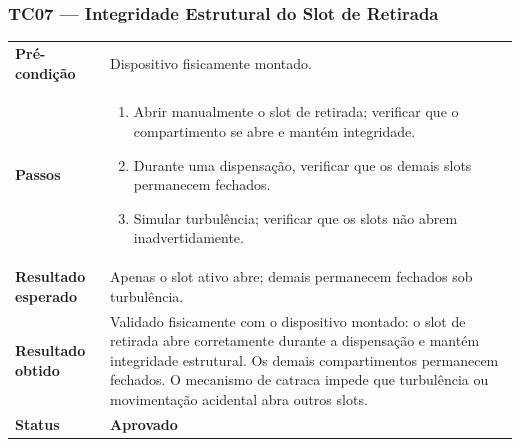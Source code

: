 \documentclass[12pt,a4paper]{article}
\newcommand{\lightrule}{\arrayrulecolor{gray!35}\midrule\arrayrulecolor{black}}
\newcommand{\aprovado}{\textcolor{green!60!black}{\textbf{Aprovado}}}
\begin{document}
\subsubsection{TC07 — Integridade Estrutural do Slot de Retirada}
\begin{table}[H]\small\setlength{\tabcolsep}{6pt}\renewcommand{\arraystretch}{1.3}
\begin{tabularx}{\textwidth}{>{\bfseries}p{4cm} X}
\toprule
Pré-condição & Dispositivo fisicamente montado. \\
\lightrule
Passos &
\begin{enumerate}[nosep,leftmargin=*]
  \item Abrir manualmente o slot de retirada; verificar que o compartimento se abre e mantém integridade.
  \item Durante uma dispensação, verificar que os demais slots permanecem fechados.
  \item Simular turbulência; verificar que os slots não abrem inadvertidamente.
\end{enumerate} \\
\lightrule
Resultado esperado & Apenas o slot ativo abre; demais permanecem fechados sob turbulência. \\
\lightrule
Resultado obtido & Validado fisicamente com o dispositivo montado: o slot de retirada abre corretamente durante a dispensação e mantém integridade estrutural. Os demais compartimentos permanecem fechados. O mecanismo de catraca impede que turbulência ou movimentação acidental abra outros slots. \\
\lightrule
Status & \aprovado \\
\bottomrule
\end{tabularx}\end{table}
\end{document}
